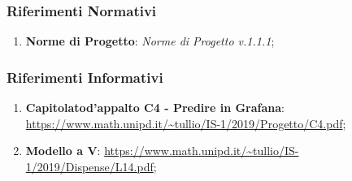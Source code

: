 		\subsubsection{Riferimenti Normativi}
		\begin{enumerate}
			\item \textbf{Norme di Progetto}: \textit{Norme di Progetto v.1.1.1};	
		\end{enumerate}
	
		\subsubsection{Riferimenti Informativi}
		\begin{enumerate}
		    \item \textbf{Capitolato\glosp d'appalto C4 - Predire in Grafana}: \url{https://www.math.unipd.it/~tullio/IS-1/2019/Progetto/C4.pdf};
		    \item \textbf{Modello a V}: \url{https://www.math.unipd.it/~tullio/IS-1/2019/Dispense/L14.pdf};
		\end{enumerate}
	
	
	

	
	
	
	
